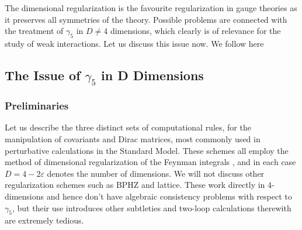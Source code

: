 \documentclass[12pt,rotate]{article}
\begin{document}
\begin{itemize}
The dimensional regularization is the favourite regularization in
gauge theories  as it preserves all symmetries of the theory. Possible
problems are connected with the treatment of $\gamma_5$ in $D\not=4$
dimensions, which clearly is of relevance for the study of weak
interactions. Let us discuss this issue now. We follow here
\cite{WEISZ}
\subsection{The Issue of $\gamma_5$ in D Dimensions}
\subsubsection{Preliminaries}
  Let us describe the three distinct sets of computational rules,
 for the manipulation of covariants and Dirac matrices,
 most commonly used in perturbative calculations in the Standard Model.
  These schemes all employ the method
 of dimensional regularization of the Feynman integrals \cite{HV,BM},
 and in each case $D=4-2\varepsilon$ denotes the number of dimensions.
 We will not discuss other regularization schemes such as BPHZ and lattice.
 These work directly in 4-dimensions and hence don't have algebraic
 consistency problems with respect to $\gamma_5$, but their use 
introduces other
 subtleties and two-loop calculations therewith are extremely tedious.
 

\end{itemize}
\end{document}
